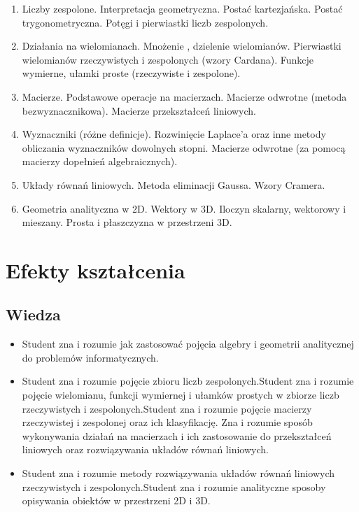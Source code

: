 \documentclass[12pt, a4paper]{article}
\begin{document}
\begin{enumerate}
  \item Liczby zespolone. Interpretacja geometryczna. Postać kartezjańska.  Postać trygonometryczna. Potęgi i pierwiastki liczb zespolonych.
  \item Działania na wielomianach. Mnożenie , dzielenie wielomianów.  Pierwiastki wielomianów rzeczywistych i zespolonych (wzory Cardana). Funkcje wymierne, ułamki proste (rzeczywiste i zespolone).
  \item Macierze. Podstawowe operacje na macierzach.  Macierze odwrotne (metoda bezwyznacznikowa). Macierze przekształceń liniowych.
  \item Wyznaczniki (różne definicje).  Rozwinięcie Laplace’a oraz inne metody obliczania wyznaczników dowolnych stopni.  Macierze odwrotne (za pomocą macierzy dopełnień algebraicznych).
  \item Układy równań liniowych. Metoda eliminacji Gaussa. Wzory Cramera.
  \item Geometria analityczna w 2D.  Wektory w 3D. Iloczyn skalarny, wektorowy i mieszany.  Prosta i płaszczyzna w przestrzeni 3D.
\end{enumerate}

\section{Efekty kształcenia}

\subsection*{Wiedza}
\begin{itemize}
  \item Student zna i rozumie  jak zastosować pojęcia algebry i geometrii analitycznej  do problemów informatycznych.
  \item Student zna i rozumie pojęcie zbioru liczb zespolonych.Student zna i rozumie pojęcie wielomianu, funkcji wymiernej i ułamków prostych w zbiorze liczb rzeczywistych i zespolonych.Student zna i rozumie pojęcie macierzy rzeczywistej i zespolonej  oraz ich klasyfikację. Zna i rozumie sposób wykonywania działań na macierzach  i ich zastosowanie do przekształceń liniowych oraz rozwiązywania układów równań liniowych.
  \item Student zna i rozumie metody rozwiązywania układów równań liniowych rzeczywistych i zespolonych.Student zna i rozumie analityczne sposoby opisywania obiektów w przestrzeni 2D i 3D.
\end{itemize}
\end{document}
